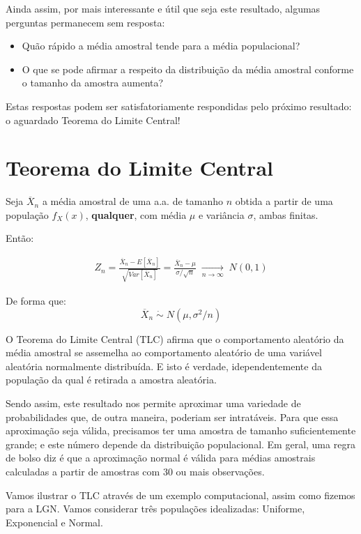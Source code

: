 \documentclass[
]{book}
\providecommand{\tightlist}{%
  \setlength{\itemsep}{0pt}\setlength{\parskip}{0pt}}
\theoremstyle{definition}
\theoremstyle{definition}
\theoremstyle{definition}
\theoremstyle{remark}
\begin{document}
Ainda assim, por mais interessante e útil que seja este resultado, algumas perguntas permanecem sem resposta:

\begin{itemize}
\tightlist
\item
  Quão rápido a média amostral tende para a média populacional?
\item
  O que se pode afirmar a respeito da distribuição da média amostral conforme o tamanho da amostra aumenta?
\end{itemize}

Estas respostas podem ser satisfatoriamente respondidas pelo próximo resultado: o aguardado Teorema do Limite Central!

\hypertarget{teorema-do-limite-central}{%
\section{Teorema do Limite Central}\label{teorema-do-limite-central}}

Seja \(\overline{X}_n\) a média amostral de uma a.a. de tamanho \(n\) obtida a partir de uma população \(f_X(x)\), \textbf{qualquer}, com média \(\mu\) e variância \(\sigma\), ambas finitas.

Então:

\begin{align*}
  Z_n 
  = \frac{\overline{X}_n - E[\overline{X}_n]}{\sqrt{\mathit{Var}[\overline{X}_n]}}
  = \frac{\overline{X}_n - \mu}{\sigma/\sqrt{n}} 
  \; \underset{n\rightarrow \infty}{\longrightarrow} \; N(0,1) 
\end{align*}

De forma que:
\[\overline{X}_n \; \dot{\sim} \; N(\mu, \sigma^2/n)\]

O Teorema do Limite Central (TLC) afirma que o comportamento aleatório da média amostral se assemelha ao comportamento aleatório de uma variável aleatória normalmente distribuída. E isto é verdade, idependentemente da população da qual é retirada a amostra aleatória.

Sendo assim, este resultado nos permite aproximar uma variedade de probabilidades que, de outra maneira, poderiam ser intratáveis. Para que essa aproximação seja válida, precisamos ter uma amostra de tamanho suficientemente grande; e este número depende da distribuição populacional. Em geral, uma regra de bolso diz é que a aproximação normal é válida para médias amostrais calculadas a partir de amostras com 30 ou mais observações.

Vamos ilustrar o TLC através de um exemplo computacional, assim como fizemos para a LGN. Vamos considerar três populações idealizadas: Uniforme, Exponencial e Normal.
\end{document}
